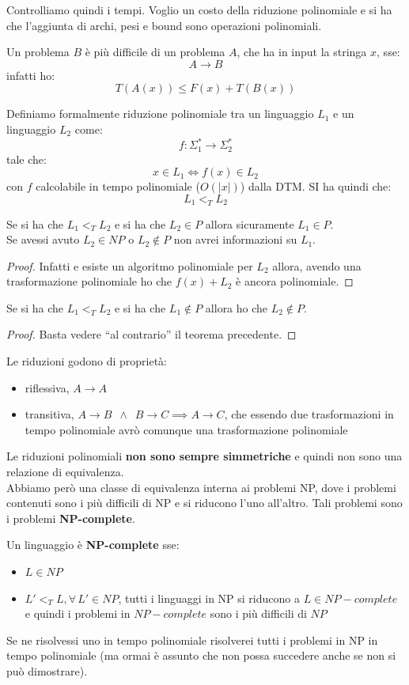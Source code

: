 \documentclass[a4paper,12pt, oneside]{book}
\begin{document}
Controlliamo quindi i tempi. Voglio un costo della riduzione polinomiale e si ha
che l'aggiunta di archi, pesi e bound sono operazioni polinomiali.
\begin{definizione}
  Un problema $B$ è più difficile di un problema $A$, che ha in input la stringa
  $x$, sse:
  \[A\to B\]
  infatti ho:
  \[T(A(x))\leq F(x)+T(B(x))\]
\end{definizione}
\begin{definizione}
  Definiamo formalmente riduzione polinomiale tra un linguaggio $L_1$ e un
  linguaggio $L_2$ come:
  \[f:\Sigma_1^*\to \Sigma_2^*\]
  tale che:
  \[x\in L_1\iff f(x)\in L_2\]
  con $f$ calcolabile in tempo polinomiale ($O(|x|)$) dalla DTM. SI ha quindi
  che:
  \[L_1<_T L_2\]
\end{definizione}
\begin{teorema}
  Se si ha che $L_1<_T L_2$ e si ha che $L_2\in P$ allora sicuramente $L_1\in
  P$.\\
  Se avessi avuto $L_2\in NP$ o $L_2\not\in P$ non avrei informazioni su $L_1$. 

\end{teorema}
\begin{proof}
  Infatti e esiste un algoritmo polinomiale per $L_2$ allora, avendo una
  trasformazione polinomiale  ho che $f(x)+L_2$ è ancora polinomiale.
\end{proof}
\begin{teorema}
  Se si ha che $L_1<_T L_2$ e si ha che $L_1\not\in P$ allora ho che
  $L_2\not\in P$.
\end{teorema}
\begin{proof}
  Basta vedere ``al contrario'' il teorema precedente.
\end{proof}
Le riduzioni godono di proprietà:
\begin{itemize}
  \item riflessiva, $A\to A$
  \item transitiva, $A\to B\,\,\,\land \,\,\,B\to C\implies A\to C$, che essendo
  due trasformazioni in tempo polinomiale avrò comunque una trasformazione
  polinomiale 
\end{itemize}
Le riduzioni polinomiali \textbf{non sono sempre simmetriche} e quindi non sono
una relazione di equivalenza.\\
Abbiamo però una classe di equivalenza interna ai problemi NP, dove i problemi
contenuti sono i più difficili di NP e si riducono l'uno all'altro. Tali
problemi sono i problemi \textbf{NP-complete}.
\begin{definizione}
  Un linguaggio è \textbf{NP-complete} sse:
  \begin{itemize}
    \item $L\in NP$
    \item $L'<_TL,\forall\,L'\in NP$, tutti i linguaggi in NP si riducono a
    $L\in NP-complete$ e quindi i problemi in $NP-complete$ sono i più difficili
    di $NP$
  \end{itemize}
  Se ne risolvessi uno in tempo polinomiale risolverei tutti i problemi in NP in
  tempo polinomiale (ma ormai è assunto che non possa succedere anche se non si
  può dimostrare).
\end{definizione}
\end{document}

